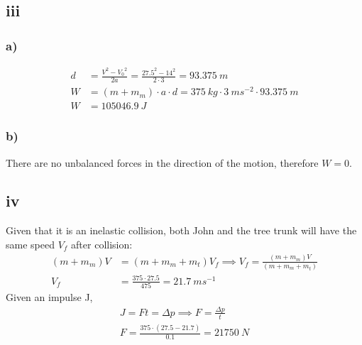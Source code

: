 \subsection*{iii}

    \subsubsection*{a)}
        \begin{equation}
            \begin{split}
                d &= \frac{V^2 - {V_0}^2}{2a} = \frac{27.5^2 - 14^2}{2\cdot 3} = \SI{93.375}{m}\\
                W &= (m+m_m) \cdot a \cdot d = \SI{375}{kg} \cdot \SI{3}{ms^{-2}} \cdot \SI{93.375}{m} \\
                W &= \SI{105046.9}{J}
            \end{split}
        \end{equation}
        
    \subsubsection*{b)}
        There are no unbalanced forces in the direction of the motion, therefore $ W = 0$.

\subsection*{iv}
    Given that it is an inelastic collision, both John and the tree trunk will have the same speed $V_f$ after collision:  
    \begin{equation}
        \begin{split}
            (m+m_m) V &= (m+ m_m + m_t) V_f \implies V_f = \frac{(m+m_m) V}{(m+ m_m + m_t)}\\
            V_f &= \frac{375 \cdot 27.5}{475} = \SI{21.7}{ms^{-1}}
        \end{split}
    \end{equation}
    Given an impulse J,
    \begin{equation}
        \begin{split}
            J = Ft = \Delta p \implies F = \frac{\Delta p}{t} \\
            F = \frac{375 \cdot (27.5 - 21.7)}{0.1} = \SI{21750}{N}
        \end{split}
    \end{equation}